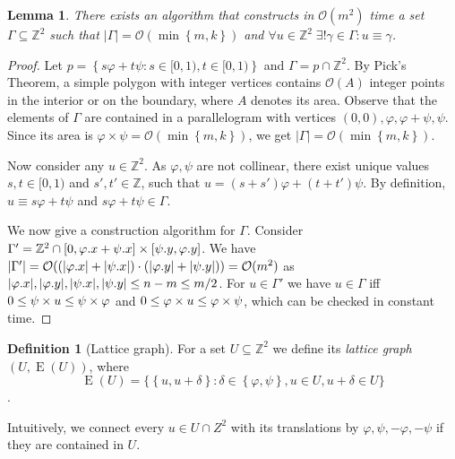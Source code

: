 \documentclass[11pt, letterpaper]{article}
\theoremstyle{plain}
\newtheorem{lemma}{Lemma}
\theoremstyle{definition}
\newtheorem{definition}{Definition}
\theoremstyle{remark}
\newcommand{\Z}{\mathbb{Z}}
\renewcommand{\O}{\mathcal{O}}
\renewcommand{\phi}{\varphi}
\newcommand{\set}[1]{\left\lbrace #1 \right\rbrace}
\newcommand{\bigset}[1]{\big \lbrace #1 \big \rbrace}
\DeclareMathOperator*{\Edges}{E}
\begin{document}
\begin{lemma} \label{lattice_base}
	There exists an algorithm that constructs in $\O(m^2)$ time a set $\Gamma \subseteq \Z^2$ such that $|\Gamma| = \O(\min\set{m, k})$ and $\forall u \in \Z^2 \; \exists! \gamma \in \Gamma : u \equiv \gamma$.
\end{lemma} 
	\begin{proof}
		Let $p = \set{s\phi + t\psi : s \in [0, 1), t \in [0, 1)}$ and $\Gamma = p \cap \Z^2$.
		By Pick's Theorem, a simple polygon with integer vertices contains $\O(A)$ integer points in the interior or on the boundary, where $A$ denotes its area.
		Observe that the elements of $\Gamma$ are contained in a parallelogram with vertices $(0, 0), \phi, \phi + \psi, \psi$.
		Since its area is $\phi \times \psi = \O(\min\set{m, k})$, we get $|\Gamma| = \O(\min\set{m, k})$.
		
		Now consider any $u \in \Z^2$.
		As $\phi, \psi$ are not collinear, there exist unique values $s, t \in [0, 1)$ and $s', t' \in \Z$, such that
		$u = (s + s') \phi + (t + t') \psi$.
		By definition, 
		$u \equiv s\phi + t\psi$ and $s\phi + t\psi \in \Gamma$.
		
		We now give a construction algorithm for $\Gamma$. Consider $\Gamma' = \Z^2 \cap [0,\x{\phi}+\x{\psi}] \times [\y{\psi},\y{\phi}]$. We have $|\Gamma'| = \O((|\x{\phi}|+|\x{\psi}|) \cdot (|\y{\phi}|+|\y{\psi}|)) = \O(m^2)$ as $|\x{\phi}|, |\y{\phi}|, |\x{\psi}|, |\y{\psi}| \le n - m \le m / 2$. For $u \in \Gamma'$ we have $u \in \Gamma$ iff $0 \le \s{u} \le \s{\phi}$ and $0 \le \h{u} \le \h{\psi}$, which can be checked in constant time. 
	\end{proof}

\begin{definition}[Lattice graph]
	For a set $U \subseteq \Z^2$ we define its \emph{lattice graph} $(U, \Edges(U))$, where
	\[ \Edges(U) = \bigset{\set{u, u + \delta} : \delta \in \set{\phi, \psi}, u \in U, u + \delta \in U}\].
\end{definition}
Intuitively, we connect every $u \in U \cap Z^2$ with its translations by $\phi, \psi, -\phi, -\psi$ if they are contained in $U$.
\end{document}
